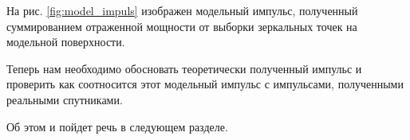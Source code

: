  На рис. \ref{fig:model_impuls} изображен модельный импульс, полученный
 суммированием отраженной мощности от выборки зеркальных точек на модельной
 поверхности. 

 Теперь нам необходимо обосновать теоретически полученный импульс и проверить
 как соотносится этот модельный импульс с импульсами, полученными реальными
 спутниками. 

 Об этом и пойдет речь в следующем разделе.
